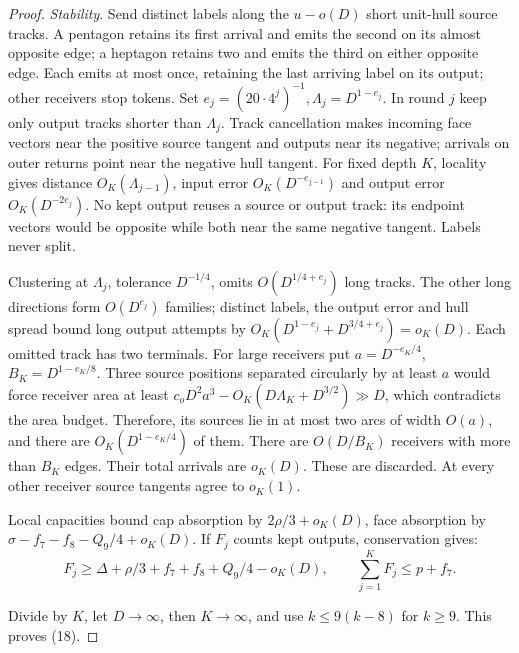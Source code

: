 \documentclass[10pt,reqno]{amsart}
\begin{document}
\begin{proof}
    \textit{Stability}. Send distinct labels along the $u - o(D)$ short unit-hull source tracks. A pentagon retains its first arrival and emits the second on its almost opposite edge; a heptagon retains two and emits the third on either opposite edge. Each emits at most once, retaining the last arriving label on its output; other receivers stop tokens. Set $e_j = (20 \cdot 4^j)^{-1}, \Lambda _ j = D^{1 - e_j}$. In round $j$ keep only output tracks shorter than $\Lambda_j$. Track cancellation makes incoming face vectors near the positive source tangent and outputs near its negative; arrivals on outer returns point near the negative hull tangent. For fixed depth $K$, locality gives distance $O_K (\Lambda_{j-1})$, input error $O_K (D^{-e_{j-1}})$ and output error $O_K (D^{-2e_j})$. No kept output reuses a source or output track: its endpoint vectors would be opposite while both near the same negative tangent. Labels never split.

    Clustering at $\Lambda_j$, tolerance $D^{-1/4}$, omits $O(D^{1/4 + e_j})$ long tracks. The other long directions form $O(D^{e_j})$ families; distinct labels, the output error and hull spread bound long output attempts by $O_K (D^{1-e_j} + D^{3/4 + e_j}) = o_K (D)$. Each omitted track has two terminals. For large receivers put $a = D^{-e_K / 4}$, $B_K = D^{1-e_K / 8}$. Three source positions separated circularly by at least $a$ would force receiver area at least $c_o D^2 a^3 - O_K (D\Lambda_K + D^{3/2}) \gg D$, which contradicts the area budget. Therefore, its sources lie in at most two arcs of width $O(a)$, and there are $O_K (D^{1 - e_K / 4})$ of them. There are $O(D / B_K)$ receivers with more than $B_K$ edges. Their total arrivals are $o_K (D)$. These are discarded. At every other receiver source tangents agree to $o_K (1)$.

    Local capacities bound cap absorption by $2 \rho / 3 + o_K (D)$, face absorption by $\sigma - f_7 - f_8 - Q_9 / 4 + o_K (D)$. If $F_j$ counts kept outputs, conservation gives:
    \begin{equation}
        F_j \ge \Delta + \rho / 3 + f_7 + f_8 + Q_9 / 4 - o_K (D), \qquad \sum_{j=1}^K F_j \le p + f_7.
    \end{equation}

    Divide by $K$, let $D \to \infty$, then $K \to \infty$, and use $k \le 9 (k - 8)$ for $k \ge 9$. This proves (18).


\end{proof}
\end{document}

